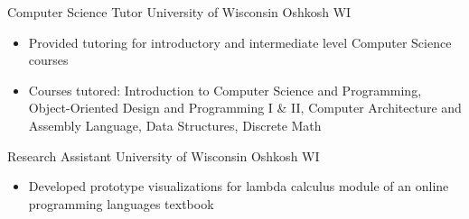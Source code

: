     {Computer Science Tutor}
    {University of Wisconsin}
    {Oshkosh}
    {WI}
    {\begin{itemize}
        \item Provided tutoring for introductory and intermediate level Computer Science courses
        \item Courses tutored: Introduction to Computer Science and Programming, Object-Oriented
        Design and Programming I \& II, Computer Architecture and Assembly Language, Data
        Structures, Discrete Math
    \end{itemize}}
    {Research Assistant} {University of Wisconsin}
    {Oshkosh}
    {WI}
    {\begin{itemize}
        \item Developed prototype visualizations for lambda calculus module of an online programming
        languages textbook
    \end{itemize}}